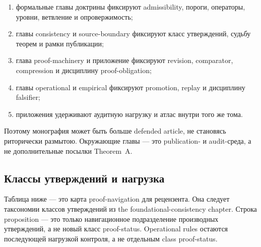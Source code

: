 \begin{enumerate}
\item формальные главы доктрины фиксируют admissibility, пороги, операторы, уровни, ветвление и опровержимость;
\item главы consistency и source-boundary фиксируют класс утверждений, судьбу теорем и рамки публикации;
\item глава proof-machinery и приложение фиксируют revision, comparator, compression и дисциплину proof-obligation;
\item главы operational и empirical фиксируют promotion, replay и дисциплину falsifier;
\item приложения удерживают аудитную нагрузку и атлас внутри того же тома.
\end{enumerate}

Поэтому монография может быть больше defended article, не становясь риторически размытою. Окружающие главы — это publication- и audit-среда, а не дополнительные посылки Theorem~A.

\subsection{Классы утверждений и нагрузка}

Таблица ниже — это карта proof-navigation для рецензента. Она следует таксономии классов утверждений из the foundational-consistency chapter. Строка proposition — это только навигационное подразделение производных утверждений, а не новый класс proof-status. Operational rules остаются последующей нагрузкой контроля, а не отдельным class proof-status.

